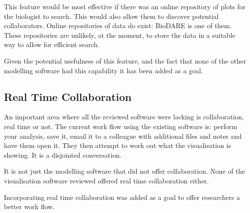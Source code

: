 This feature would be most effective if there was an online repository of plots for the biologist to search.  This would also allow them to discover potential collaborators.  Online repositories of data do exist: BioDARE is one of them.  These repositories are unlikely, at the moment, to store the data in a suitable way to allow for efficient search.

Given the potential usefulness of this feature, and the fact that none of the other modelling software had this capability it has been added as a goal.

\subsection{Real Time Collaboration}

An important area where all the reviewed software were lacking is collaboration, real time or not.  The current work flow using the existing software is: perform your analysis, save it, email it to a colleague with additional files and notes and have them open it. They then attempt to work out what the visualisation is showing.  It is a disjointed conversation.

It is not just the modelling software that did not offer collaboration. None of the visualisation software reviewed offered real time collaboration either.

Incorporating real time collaboration was added as a goal to offer researchers a better work flow.
